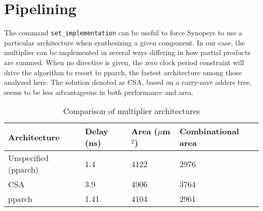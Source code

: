 \section{Pipelining}
The command \texttt{set\_implementation} can be useful to force Synopsys to use a particular architecture when synthesizing a given component. In our case, the multiplier can be implemented in several ways differing in how partial products are summed. When no directive is given, the zero clock period constraint will drive the algorithm to resort to pparch, the fastest architecture among those analyzed here. The solution denoted as CSA, based on a carry-save adders tree, seems to be less advantageous in both performance and area. 
\begin{table}[h]
	\centering
	\begin{tabular}{|l|l|l|l|}\hline
		Architecture & Delay (ns) & Area ($\mu$m$^2$) & Combinational area \\\hline
		Unspecified (pparch) & 1.4 & 4122 & 2976 \\\hline
		CSA & 3.9 & 4906 & 3764 \\\hline
		pparch & 1.41 & 4104 & 2961 \\\hline
	\end{tabular}
\caption{Comparison of multiplier architectures}
\end{table}
